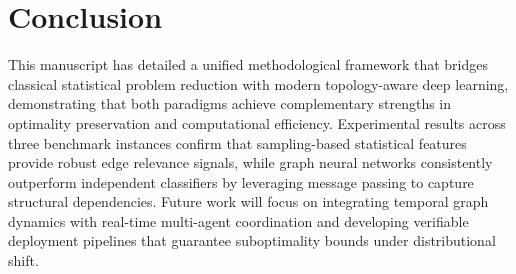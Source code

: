 \documentclass[twoside]{article}
\begin{document}
	

	

	\section{Conclusion}
	 This manuscript has detailed a unified methodological framework that bridges classical statistical problem reduction with modern topology-aware deep learning, demonstrating that both paradigms achieve complementary strengths in optimality preservation and computational efficiency. Experimental results across three benchmark instances confirm that sampling-based statistical features provide robust edge relevance signals, while graph neural networks consistently outperform independent classifiers by leveraging message passing to capture structural dependencies. Future work will focus on integrating temporal graph dynamics with real-time multi-agent coordination and developing verifiable deployment pipelines that guarantee suboptimality bounds under distributional shift.

	
\end{document}

